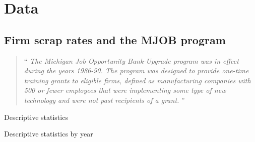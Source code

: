 \section{Data}
\label{s:data}

\subsection{Firm scrap rates and the MJOB program}
\begin{quote}
    \enquote{
        \textit{The Michigan Job Opportunity Bank-Upgrade program was in effect during the years 1986-90. The program was designed to provide one-time training grants to eligible firms, defined as manufacturing companies with 500 or fewer employees that were implementing some type of new technology and were not past recipients of a grant.}
    } \citep{holzer1993training}
\end{quote}

\begin{table}
    \centering
    \caption{Descriptive statistics} \label{tab:descriptive}
    
\end{table}

\begin{table}
    \centering
    \caption{Descriptive statistics by year} \label{tab:descriptive_yearly}
    
\end{table}